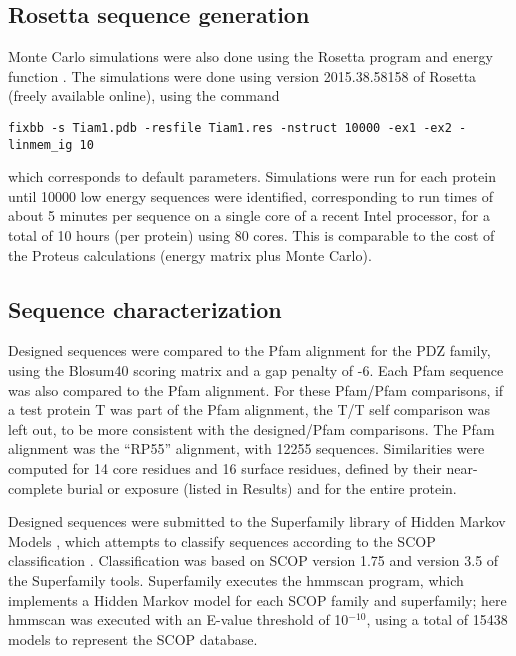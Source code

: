 \documentclass[12pt]{article}
\begin{document}
\subsection{Rosetta sequence generation}
Monte Carlo simulations were also done using the Rosetta program and energy function \cite{Baker06b}. The simulations
were done using version 2015.38.58158 of Rosetta (freely available online), using the command \small
\begin{verbatim}
fixbb -s Tiam1.pdb -resfile Tiam1.res -nstruct 10000 -ex1 -ex2 -linmem_ig 10
\end{verbatim} \normalsize
which corresponds to default parameters. Simulations were run for each protein until 10000 low energy sequences were identified,
corresponding to run times of about 5 minutes per sequence on a single core of a recent Intel processor, for a total of 10 hours
(per protein) using 80 cores. This is comparable to the cost of the Proteus calculations (energy matrix plus Monte Carlo).

\subsection{Sequence characterization}
Designed sequences were compared to the Pfam alignment for the PDZ family, using the Blosum40 scoring matrix and a
gap penalty of -6. Each Pfam sequence was also compared to the Pfam alignment. For these Pfam/Pfam comparisons, if a
test protein T was part of the Pfam alignment, the T/T self comparison was left out, to be more consistent with the
designed/Pfam comparisons. The Pfam alignment was the ``RP55'' alignment, with 12255 sequences. Similarities were
computed for 14 core residues and 16 surface residues, defined by their near-complete burial or exposure (listed in 
Results) and for the entire protein.

Designed sequences were submitted to the Superfamily library of Hidden Markov Models \cite{Gough01,Wilson07},
which attempts to classify sequences according to the SCOP classification \cite{Andreeva04}. Classification was
based on SCOP version 1.75 and version 3.5 of the Superfamily tools. Superfamily executes the hmmscan program,
which implements a Hidden Markov model for each SCOP family and superfamily; here hmmscan was executed with an
E-value threshold of 10$^{-10}$, using a total of 15438 models to represent the SCOP database.
\end{document}
